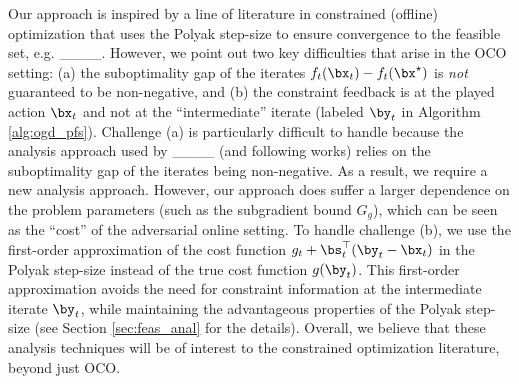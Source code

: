 Our approach is inspired by a line of literature in constrained (offline) optimization that uses the Polyak step-size to ensure convergence to the feasible set, e.g. ____.
However, we point out two key difficulties that arise in the OCO setting: (a) the suboptimality gap of the iterates $f_t(\bx_t) - f_t(\bx^\star)$ is \emph{not} guaranteed to be non-negative, and (b) the constraint feedback is at the played action $\bx_t$ and not at the ``intermediate'' iterate (labeled $\by_t$ in Algorithm \ref{alg:ogd_pfs}).
Challenge (a) is particularly difficult to handle because the analysis approach used by ____ (and following works) relies on the suboptimality gap of the iterates being non-negative.
As a result, we require a new analysis approach.
However, our approach does suffer a larger dependence on the problem parameters (such as the subgradient bound $G_g$), which can be seen as the ``cost'' of the adversarial online setting.
To handle challenge (b), we use the first-order approximation of the cost function $g_t + \bs_t^\top (\by_t - \bx_t)$ in the Polyak step-size instead of the true cost function $g(\by_t)$.
This first-order approximation avoids the need for constraint information at the intermediate iterate $\by_t$, while maintaining the advantageous properties of the Polyak step-size (see Section \ref{sec:feas_anal} for the details).
Overall, we believe that these analysis techniques will be of interest to the constrained optimization literature, beyond just OCO.